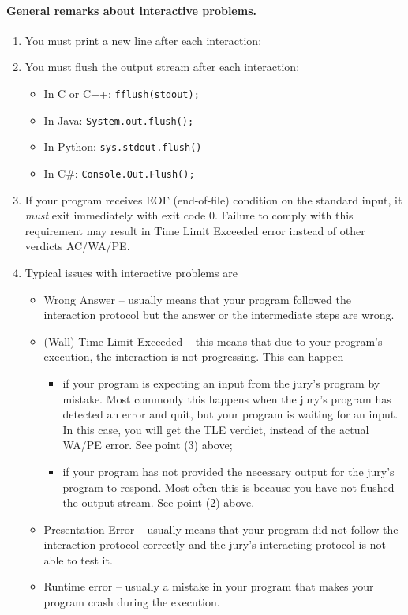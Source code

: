 \paragraph{General remarks about interactive problems.}
\begin{enumerate}
    \item You must print a new line after each interaction;
    \item You must flush the output stream after each interaction:
    \begin{itemize}
        \item In C or C++: \texttt{fflush(stdout);}
        \item In Java: \texttt{System.out.flush();}
        \item In Python: \texttt{sys.stdout.flush()}
        \item In C\#: \texttt{Console.Out.Flush();}
    \end{itemize}
    
    \item If your program receives EOF (end-of-file) condition on the standard input, it \emph{must} exit immediately with exit code 0.
    Failure to comply with this requirement may result in Time Limit Exceeded error instead of other verdicts AC/WA/PE.
    
    \item Typical issues with interactive problems are
    \begin{itemize}
        \item Wrong Answer -- usually means that your program followed the interaction protocol but the answer or the intermediate steps are wrong.
        
        \item (Wall) Time Limit Exceeded -- this means that due to your program's execution, the interaction is not progressing.
        This can happen 
        \begin{itemize}
            \item if your program is expecting an input from the jury’s program by mistake.
            Most commonly this happens when the jury's program has detected an error and quit, but your program is waiting for an input.
            In this case, you will get the TLE verdict, instead of the actual WA/PE error.
            See point (3) above;
            \item if your program has not provided the necessary output for the jury’s program to respond.
            Most often this is because you have not flushed the output stream.
            See point (2) above.
        \end{itemize}
        
        \item Presentation Error -- usually means that your program did not follow the interaction protocol correctly and the jury’s interacting protocol is not able to test it.
        
        \item Runtime error -- usually a mistake in your program that makes your program crash during the execution.
    \end{itemize}
\end{enumerate}
